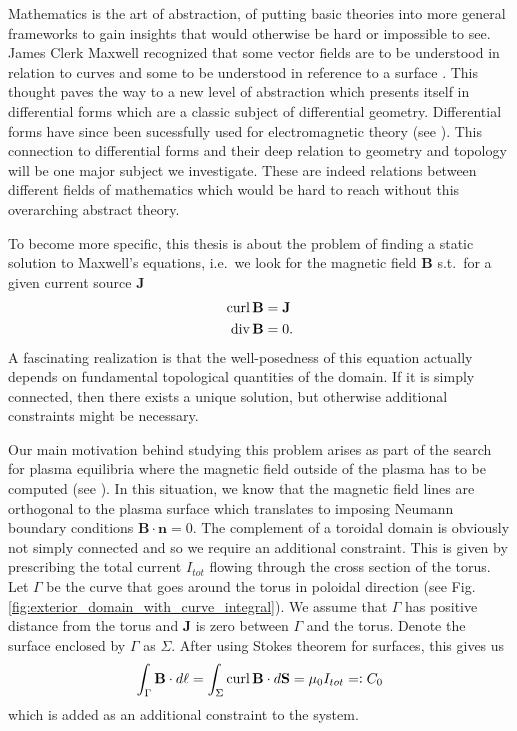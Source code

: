 \documentclass[../master_thesis.tex]{subfiles}
\begin{document}
Mathematics is the art of abstraction, of putting basic theories into more 
general frameworks to gain insights that would otherwise be hard or 
impossible to see. James Clerk Maxwell recognized that some
vector fields are to be understood in relation to curves 
and some to be understood in reference to a surface \cite[p.69]{arnold}. 
This thought paves the way to a new level of abstraction
which presents itself in differential forms which are a classic 
subject of differential geometry. Differential forms have since been sucessfully
used for electromagnetic theory (see \cite{differential_forms_electromagnetism}).
This connection to differential forms and their deep relation to geometry and topology
will be one major subject we investigate. These are indeed relations between different 
fields of mathematics which would be hard to reach without this overarching abstract theory.

To become more specific, this thesis is about the problem of finding a static solution to Maxwell's equations,
i.e.~we look for the magnetic field $\mathbf{B}$ s.t.~for a given current source 
$\mathbf{J}$ 
\begin{align*}
    \operatorname{curl} \mathbf{B} &= \mathbf{J} 
    \\ \operatorname{div} \mathbf{B} &= 0.
\end{align*}
A fascinating realization is that the well-posedness of this equation actually 
depends on fundamental topological quantities of the domain. If it is simply 
connected, then there exists a unique solution, but otherwise additional constraints 
might be necessary.

Our main motivation behind studying this problem arises as part of the search for plasma equilibria where 
the magnetic field outside of the plasma has to be computed (see \cite{merkel1986}).
In this situation, we know that the magnetic field lines are orthogonal to the plasma surface
which translates to imposing Neumann boundary conditions 
$\mathbf{B} \cdot \mathbf{n} = 0$. The complement of a toroidal domain is obviously not simply connected and so 
we require an additional constraint. This is given by prescribing the total 
current  $I_{tot}$ flowing through the cross section of the torus.
Let $\Gamma$ be the curve that goes around the torus 
in poloidal direction (see Fig.\,\ref{fig:exterior_domain_with_curve_integral}). 
We assume that $\Gamma$ has positive distance from the torus and 
$\mathbf{J}$ is zero between $\Gamma$ and the torus.
Denote the surface enclosed by $\Gamma$ as $\Sigma$.
After using Stokes theorem 
for surfaces, this gives us 
\begin{align*}
    \int_\Gamma \mathbf{B}\cdot d\ell= \int_\Sigma \operatorname{curl} \mathbf{B} \cdot d\mathbf{S} 
    = \mu_0 I_{tot} =\vcentcolon C_0
\end{align*}
which is added as an additional constraint to the system.
\end{document}
